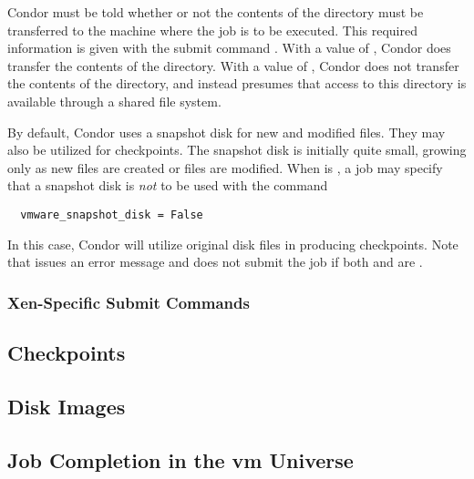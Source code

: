 Condor must be told whether or not the contents of the 
directory must be transferred to the machine where the job is
to be executed.
This required information is given with the submit command
.
With a value of ,
Condor does transfer the contents of the directory.
With a value of ,
Condor does not transfer the contents of the directory,
and instead presumes that access to this directory is
available through a shared file system.

By default, Condor uses a snapshot disk for new and modified files.
They may also be utilized for checkpoints.
The snapshot disk is initially quite small,
growing only as new files are created or files are modified.
When  is ,
a job may specify that a snapshot disk is \emph{not} to be
used with the command
\begin{verbatim}
  vmware_snapshot_disk = False
\end{verbatim}
In this case, Condor will utilize original disk files in producing
checkpoints. 
Note that  issues an error message and does not
submit the job if both 
and  are .


\subsubsection{\label{sec:vm-Xensubmitfile}Xen-Specific Submit Commands}
\Todo

\subsection{\label{sec:vm-checkpoints}Checkpoints}
\Todo

\subsection{\label{sec:vm-disk-image-details}Disk Images}
\Todo

\subsection{\label{sec:vm-job-completion-details}Job Completion in the vm Universe}

